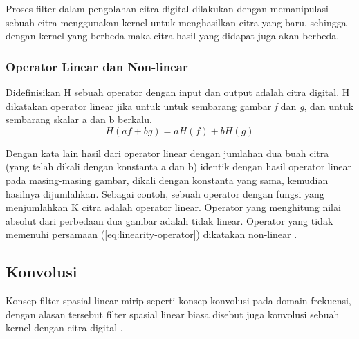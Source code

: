 Proses filter dalam pengolahan citra digital dilakukan dengan memanipulasi sebuah citra menggunakan kernel untuk menghasilkan citra yang baru, sehingga dengan kernel yang berbeda maka citra hasil yang didapat juga akan berbeda. 

\subsubsection{Operator Linear dan Non-linear}
Didefinisikan H sebuah operator dengan input dan output adalah citra digital. H dikatakan operator linear jika untuk untuk sembarang gambar \textit{f} dan \textit{g}, dan untuk sembarang skalar a dan b berkalu,
\begin{equation}
    \label{eq:linearity-operator}
    H(af + bg) = aH(f) + bH(g)
\end{equation}

Dengan kata lain hasil dari operator linear dengan jumlahan dua buah citra (yang telah dikali dengan konstanta a dan b) identik dengan hasil operator linear pada masing-masing gambar, dikali dengan konstanta yang sama, kemudian hasilnya dijumlahkan. Sebagai contoh, sebuah operator dengan fungsi yang menjumlahkan K citra adalah operator linear. Operator yang menghitung nilai absolut dari perbedaan dua gambar adalah tidak linear. Operator yang tidak memenuhi persamaan (\ref{eq:linearity-operator}) dikatakan non-linear .

\subsection{Konvolusi}
Konsep filter spasial linear mirip seperti konsep konvolusi pada domain frekuensi, dengan alasan tersebut filter spasial linear biasa disebut juga konvolusi sebuah kernel dengan citra digital . 



